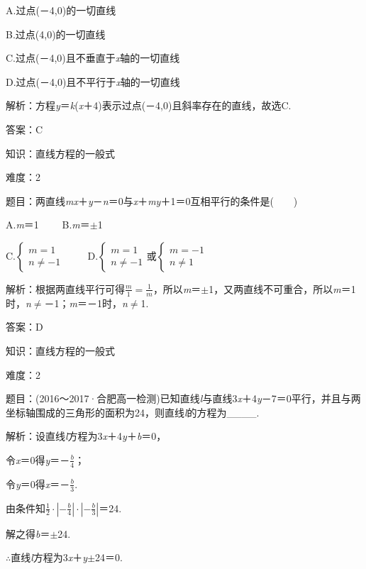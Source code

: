 \documentclass{article} %
\begin{document}
A.过点(－4,0)的一切直线

B.过点(4,0)的一切直线

C.过点(－4,0)且不垂直于\textit{x}轴的一切直线

D.过点(－4,0)且不平行于\textit{x}轴的一切直线

解析：方程\textit{y}＝\textit{k}(\textit{x}＋4)表示过点(－4,0)且斜率存在的直线，故选C.

答案：C

知识：直线方程的一般式

难度：2

题目：两直线\textit{mx}＋\textit{y}－\textit{n}＝0与\textit{x}＋\textit{my}＋1＝0互相平行的条件是(　　)

A.\textit{m}＝1　　  B.\textit{m}＝$\mathrm{\pm}$1

C.$\left\{\begin{array}{l} m=1\\ n\neq -1 \end{array}\right.$　　  D.$\left\{\begin{array}{l} m=1\\ n\neq -1 \end{array}\right.$或$\left\{\begin{array}{l} m=-1\\ n\neq 1 \end{array}\right.$

解析：根据两直线平行可得$\frac{m}{1}=\frac{1}{m}$，所以\textit{m}＝$\mathrm{\pm}$1，又两直线不可重合，所以\textit{m}＝1时，\textit{n}$\mathrm{\neq}$－1；\textit{m}＝－1时，\textit{n}$\mathrm{\neq}$1.

答案：D

知识：直线方程的一般式

难度：2

题目：(2016～2017·合肥高一检测)已知直线\textit{l}与直线3\textit{x}＋4\textit{y}－7＝0平行，并且与两坐标轴围成的三角形的面积为24，则直线\textit{l}的方程为\_\_\_\_.

解析：设直线\textit{l}方程为3\textit{x}＋4\textit{y}＋\textit{b}＝0，

令\textit{x}＝0得\textit{y}＝－$\frac{b}{4}$；

令\textit{y}＝0得\textit{x}＝－$\frac{b}{3}$.

由条件知$\frac{1}{2}\cdot|-\frac{b}{4}|\cdot|-\frac{b}{3}|$＝24.

解之得\textit{b}＝$\mathrm{\pm}$24.

$\mathrm{\therefore}$直线\textit{l}方程为3\textit{x}＋\textit{y}$\mathrm{\pm}$24＝0.
\end{document}
